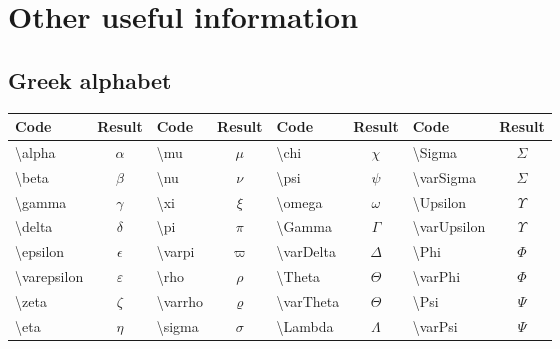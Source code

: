 \newpage
\section{Other useful information}

\subsection{Greek alphabet}

\begin{center}
\begin{tabular}{|l|c||l|c|l|c||l|c|} \hline
Code                        & Result            & Code                        & Result      & Code                        & Result          & Code                        & Result          \\ \hline \hline
\textbackslash alpha        & $\alpha$          & \textbackslash mu           & $\mu$       & \textbackslash chi          & $\chi$          & \textbackslash Sigma        & $\Sigma$        \\ \hline
\textbackslash beta         & $\beta$           & \textbackslash nu           & $\nu$       & \textbackslash psi          & $\psi$          & \textbackslash varSigma     & $\varSigma$     \\ \hline
\textbackslash gamma        & $\gamma$          & \textbackslash xi           & $\xi$       & \textbackslash omega        & $\omega$        & \textbackslash Upsilon      & $\Upsilon$      \\ \hline
\textbackslash delta        & $\delta$          & \textbackslash pi           & $\pi$       & \textbackslash Gamma        & $\Gamma$        & \textbackslash varUpsilon   & $\varUpsilon$   \\ \hline
\textbackslash epsilon      & $\epsilon$        & \textbackslash varpi        & $\varpi$    & \textbackslash varDelta     & $\varDelta$     & \textbackslash Phi          & $\Phi$          \\ \hline
\textbackslash varepsilon   & $\varepsilon$     & \textbackslash rho          & $\rho$      & \textbackslash Theta        & $\Theta$        & \textbackslash varPhi       & $\varPhi$       \\ \hline
\textbackslash zeta         & $\zeta$           & \textbackslash varrho       & $\varrho$   & \textbackslash varTheta     & $\varTheta$     & \textbackslash Psi          & $\Psi$          \\ \hline
\textbackslash eta          & $\eta$            & \textbackslash sigma        & $\sigma$    & \textbackslash Lambda       & $\Lambda$       & \textbackslash varPsi       & $\varPsi$       \\ \hline

\end{tabular}
\end{center}
